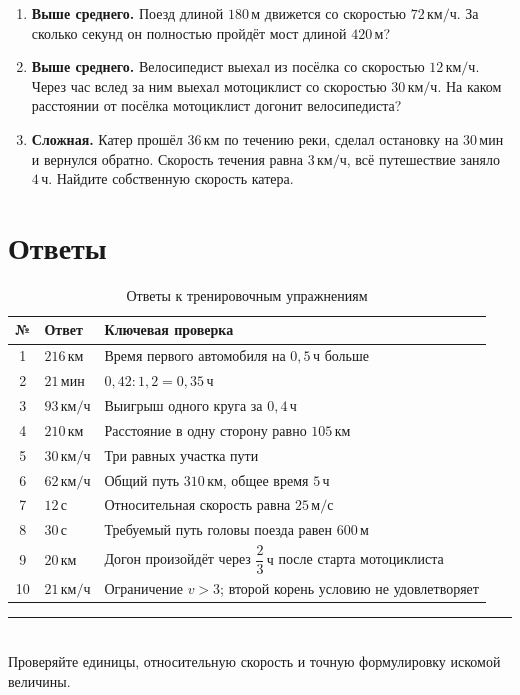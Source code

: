 \documentclass[a4paper,12pt]{article}
\newcommand{\unit}[1]{\,\text{#1}}
\begin{document}
\begin{enumerate}
  \item \textbf{Выше среднего.}
  Поезд длиной $180\unit{м}$ движется со скоростью $72\unit{км/ч}$.
  За сколько секунд он полностью пройдёт мост длиной $420\unit{м}$?

  \item \textbf{Выше среднего.}
  Велосипедист выехал из посёлка со скоростью $12\unit{км/ч}$.
  Через час вслед за ним выехал мотоциклист со скоростью
  $30\unit{км/ч}$.
  На каком расстоянии от посёлка мотоциклист догонит велосипедиста?

  \item \textbf{Сложная.}
  Катер прошёл $36\unit{км}$ по течению реки,
  сделал остановку на $30\unit{мин}$ и вернулся обратно.
  Скорость течения равна $3\unit{км/ч}$,
  всё путешествие заняло $4\unit{ч}$.
  Найдите собственную скорость катера.
\end{enumerate}

\clearpage
\section*{Ответы}

\begin{table}[ht]
\centering
\caption{Ответы к тренировочным упражнениям}
\begin{tabularx}{\linewidth}{@{}c l X@{}}
\toprule
№ & Ответ & Ключевая проверка \\
\midrule
1
& $216\unit{км}$
& Время первого автомобиля на $0{,}5\unit{ч}$ больше \\

2
& $21\unit{мин}$
& $0{,}42:1{,}2=0{,}35\unit{ч}$ \\

3
& $93\unit{км/ч}$
& Выигрыш одного круга за $0{,}4\unit{ч}$ \\

4
& $210\unit{км}$
& Расстояние в одну сторону равно $105\unit{км}$ \\

5
& $30\unit{км/ч}$
& Три равных участка пути \\

6
& $62\unit{км/ч}$
& Общий путь $310\unit{км}$, общее время $5\unit{ч}$ \\

7
& $12\unit{с}$
& Относительная скорость равна $25\unit{м/с}$ \\

8
& $30\unit{с}$
& Требуемый путь головы поезда равен $600\unit{м}$ \\

9
& $20\unit{км}$
& Догон произойдёт через $\dfrac{2}{3}\unit{ч}$
после старта мотоциклиста \\

10
& $21\unit{км/ч}$
& Ограничение $v>3$; второй корень условию не удовлетворяет \\
\bottomrule
\end{tabularx}
\end{table}

\vfill

\begin{center}
{\color{darkaccent}\rule{0.72\linewidth}{0.6pt}}\\[0.5em]
\small
Проверяйте единицы, относительную скорость
и точную формулировку искомой величины.
\end{center}
\end{document}
